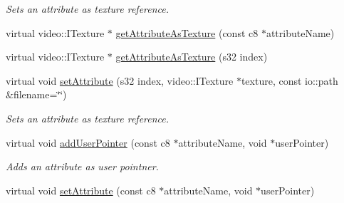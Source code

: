 \begin{DoxyCompactItemize}
\begin{DoxyCompactList}\small\item\em Sets an attribute as texture reference. \end{DoxyCompactList}\item 
virtual video\-::\-I\-Texture $\ast$ \hyperlink{classirr_1_1io_1_1_c_attributes_a4fb19d011c409eeb79aca7d8cccfc88e}{get\-Attribute\-As\-Texture} (const c8 $\ast$attribute\-Name)
\item 
virtual video\-::\-I\-Texture $\ast$ \hyperlink{classirr_1_1io_1_1_c_attributes_a85903c5c27f0d1ca424bc2627dd4126a}{get\-Attribute\-As\-Texture} (s32 index)
\item 
\hypertarget{classirr_1_1io_1_1_c_attributes_a743540a8b82b8e1d741571f262c25543}{virtual void \hyperlink{classirr_1_1io_1_1_c_attributes_a743540a8b82b8e1d741571f262c25543}{set\-Attribute} (s32 index, video\-::\-I\-Texture $\ast$texture, const io\-::path \&filename=\char`\"{}\char`\"{})}\label{classirr_1_1io_1_1_c_attributes_a743540a8b82b8e1d741571f262c25543}

\begin{DoxyCompactList}\small\item\em Sets an attribute as texture reference. \end{DoxyCompactList}\item 
\hypertarget{classirr_1_1io_1_1_c_attributes_a9473aaaa0b1c7e3b68f6212bc19e2546}{virtual void \hyperlink{classirr_1_1io_1_1_c_attributes_a9473aaaa0b1c7e3b68f6212bc19e2546}{add\-User\-Pointer} (const c8 $\ast$attribute\-Name, void $\ast$user\-Pointer)}\label{classirr_1_1io_1_1_c_attributes_a9473aaaa0b1c7e3b68f6212bc19e2546}

\begin{DoxyCompactList}\small\item\em Adds an attribute as user pointner. \end{DoxyCompactList}\item 
\hypertarget{classirr_1_1io_1_1_c_attributes_ae1f3a7ed3c976d464fa024c07e0c095c}{virtual void \hyperlink{classirr_1_1io_1_1_c_attributes_ae1f3a7ed3c976d464fa024c07e0c095c}{set\-Attribute} (const c8 $\ast$attribute\-Name, void $\ast$user\-Pointer)}\label{classirr_1_1io_1_1_c_attributes_ae1f3a7ed3c976d464fa024c07e0c095c}


\end{DoxyCompactItemize}
